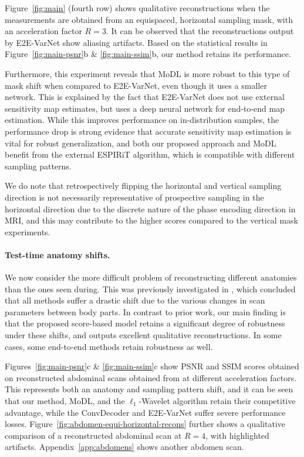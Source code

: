 \documentclass{article}
\begin{document}
Figure~\ref{fig:main} (fourth row) shows qualitative reconstructions when the measurements are obtained from an equispaced, horizontal sampling mask, with an acceleration factor $R=3$. It can be observed that the reconstructions output by E2E-VarNet show aliasing artifacts. Based on the statistical results in Figure~\ref{fig:main-psnr}b \& \ref{fig:main-ssim}b, our method retains its performance.

Furthermore, this experiment reveals that MoDL is more robust to this type of mask shift when compared to E2E-VarNet, even though it uses a smaller network. This is explained by the fact that E2E-VarNet does not use external sensitivity map estimates, but uses a deep neural network for end-to-end map estimation. While this improves performance on in-distribution samples, the performance drop is strong evidence that accurate sensitivity map estimation is vital for robust generalization, and both our proposed approach and MoDL benefit from the external ESPIRiT algorithm, which is compatible with different sampling patterns.

We do note that retrospectively flipping the horizontal and vertical sampling direction is not necessarily representative of prospective sampling in the horizontal direction due to the discrete nature of the phase encoding direction in MRI, and this may contribute to the higher scores compared to the vertical mask experiments.

\paragraph{Test-time anatomy shifts.}
We now consider the more difficult problem of reconstructing different anatomies than the ones seen during. This was previously investigated in \cite{darestani2021measuring}, which concluded that all methods suffer a drastic shift due to the various changes in scan parameters between body parts. In contrast to prior work, our main finding is that the proposed score-based model retains a significant degree of robustness under these shifts, and outputs excellent qualitative reconstructions. In some cases, some end-to-end methods retain robustness as well.

Figures~\ref{fig:main-psnr}c \& \ref{fig:main-ssim}c show PSNR and SSIM scores obtained on reconstructed abdominal scans obtained from \cite{mridataorg} at different acceleration factors. This represents both an anatomy and sampling pattern shift, and it can be seen that our method, MoDL, and the $\ell_1$-Wavelet algorithm retain their competitive advantage, while the ConvDecoder and E2E-VarNet suffer severe performance losses. Figure~\ref{fig:abdomen-equi-horizontal-recons} further shows a qualitative comparison of a reconstructed abdominal scan at $R=4$, with highlighted artifacts. Appendix~\ref{app:abdomens} shows another abdomen scan.
\end{document}
